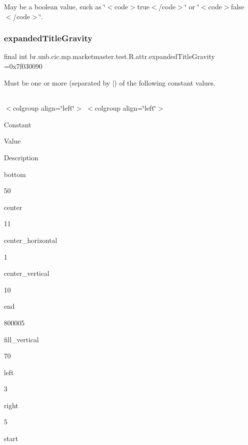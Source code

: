 May be a boolean value, such as \char`\"{}$<$code$>$true$<$/code$>$\char`\"{} or \char`\"{}$<$code$>$false$<$/code$>$\char`\"{}. \mbox{\label{classbr_1_1unb_1_1cic_1_1mp_1_1marketmaster_1_1test_1_1R_1_1attr_a52f727d36262221bd2abf0c3a0ac7d56}} 
\subsubsection{\texorpdfstring{expanded\+Title\+Gravity}{expandedTitleGravity}}
{\footnotesize\ttfamily final int br.\+unb.\+cic.\+mp.\+marketmaster.\+test.\+R.\+attr.\+expanded\+Title\+Gravity =0x7f030090\hspace{0.3cm}{\ttfamily [static]}}

Must be one or more (separated by \textquotesingle{}$\vert$\textquotesingle{}) of the following constant values.

\tabulinesep=1mm
\begin{longtabu} spread 0pt [c]{*{0}{|X[-1]}|}
\hline
\end{longtabu}
$<$colgroup align=\char`\"{}left\char`\"{}$>$ $<$colgroup align=\char`\"{}left\char`\"{}$>$ 

Constant

Value

Description 

bottom

50

center

11

center\+\_\+horizontal

1

center\+\_\+vertical

10

end

800005

fill\+\_\+vertical

70

left

3

right

5

start

